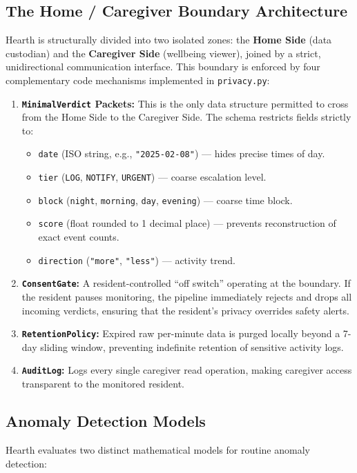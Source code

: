 \documentclass[conference]{IEEEtran}
\begin{document}
\subsection{The Home / Caregiver Boundary Architecture}
Hearth is structurally divided into two isolated zones: the \textbf{Home Side} (data custodian) and the \textbf{Caregiver Side} (wellbeing viewer), joined by a strict, unidirectional communication interface. This boundary is enforced by four complementary code mechanisms implemented in \texttt{privacy.py}:
\begin{enumerate}
  \item \textbf{\texttt{MinimalVerdict} Packets:} This is the only data structure permitted to cross from the Home Side to the Caregiver Side. The schema restricts fields strictly to:
  \begin{itemize}
    \item \texttt{date} (ISO string, e.g., \texttt{"2025-02-08"}) --- hides precise times of day.
    \item \texttt{tier} (\texttt{LOG}, \texttt{NOTIFY}, \texttt{URGENT}) --- coarse escalation level.
    \item \texttt{block} (\texttt{night}, \texttt{morning}, \texttt{day}, \texttt{evening}) --- coarse time block.
    \item \texttt{score} (float rounded to 1 decimal place) --- prevents reconstruction of exact event counts.
    \item \texttt{direction} (\texttt{"more"}, \texttt{"less"}) --- activity trend.
  \end{itemize}
  \item \textbf{\texttt{ConsentGate}:} A resident-controlled ``off switch'' operating at the boundary. If the resident pauses monitoring, the pipeline immediately rejects and drops all incoming verdicts, ensuring that the resident's privacy overrides safety alerts.
  \item \textbf{\texttt{RetentionPolicy}:} Expired raw per-minute data is purged locally beyond a 7-day sliding window, preventing indefinite retention of sensitive activity logs.
  \item \textbf{\texttt{AuditLog}:} Logs every single caregiver read operation, making caregiver access transparent to the monitored resident.
\end{enumerate}

\subsection{Anomaly Detection Models}
Hearth evaluates two distinct mathematical models for routine anomaly detection:
\end{document}
